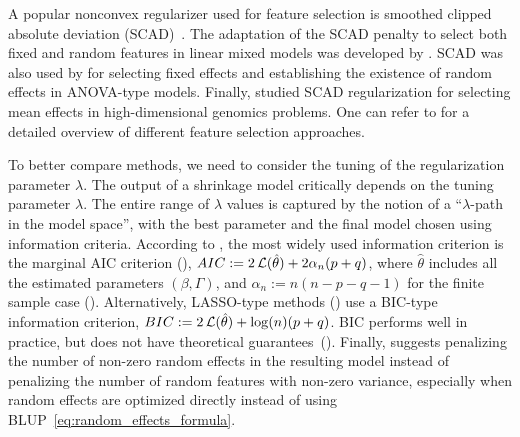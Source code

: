  A popular nonconvex regularizer used for feature selection is smoothed clipped absolute deviation (SCAD)~\cite{Fan2001}. 
The adaptation of the SCAD penalty to select both fixed and random features in 
linear mixed models was developed by \cite{Fan2012}. SCAD was also used by \cite{chen2015inference} for selecting fixed effects and establishing the existence of random effects in ANOVA-type models. Finally, \cite{Ghosh2018} studied SCAD regularization for selecting mean effects in high-dimensional genomics problems. One can refer to \cite{Muller2013, Buscemi2019Survey} for a detailed overview of different feature selection approaches.

To better compare methods, we need to consider the tuning of the regularization parameter 
$\lambda$. 
The output of a shrinkage model critically depends on the tuning parameter 
$\lambda$. The entire range of $\lambda$ values is captured 
by the notion of a ``$\lambda$-path in the model space'', with  the best parameter and the final model chosen using information criteria. According to \cite{Muller2013}, the most widely used information criterion is the marginal AIC criterion (\cite{Vaida2005}),
 \(  AIC := 2\operatorname{\mathcal{L}}(\hat{\theta}) + 2\alpha_n(p+q)\), 
  where $\hat\theta$ includes all the estimated parameters $(\beta, \Gamma)$, and $\alpha_n := n(n-p-q-1)$ for the finite sample case (\cite{Sugiura1978}). 
  Alternatively, LASSO-type methods (\cite{Krishna2008, Ibrahim2011}) use a BIC-type information criterion,  \(BIC := 2\operatorname{\mathcal{L}}(\hat{\theta}) + \log(n)(p+q)\).
BIC performs well in practice, but does not have theoretical guarantees~(\cite{schelldorfer2011estimation}). Finally, \cite{Hui2017} suggests penalizing the number of non-zero random effects in the resulting model instead of penalizing the number of random features with non-zero variance, especially when random effects are optimized directly instead of using BLUP~\eqref{eq:random_effects_formula}.
  
